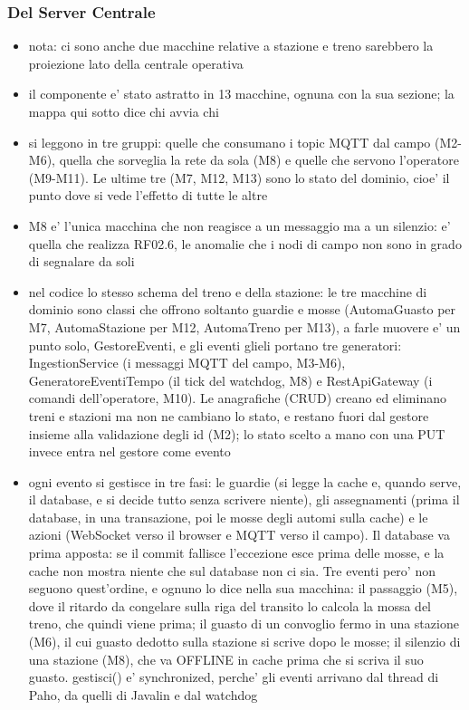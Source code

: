 \documentclass[11pt]{article}
\begin{document}
\subsubsection{Del Server Centrale}
\label{sec:orgd73620b}
\begin{itemize}
\item nota: ci sono anche due macchine relative a stazione e treno sarebbero la proiezione lato della centrale operativa
\item il componente e' stato astratto in 13 macchine, ognuna con la sua sezione; la mappa qui sotto dice chi avvia chi
\item si leggono in tre gruppi: quelle che consumano i topic MQTT dal campo (M2-M6), quella che sorveglia la rete da sola (M8) e quelle che servono l'operatore (M9-M11). Le ultime tre (M7, M12, M13) sono lo stato del dominio, cioe' il punto dove si vede l'effetto di tutte le altre
\item M8 e' l'unica macchina che non reagisce a un messaggio ma a un silenzio: e' quella che realizza RF02.6, le anomalie che i nodi di campo non sono in grado di segnalare da soli
\item nel codice lo stesso schema del treno e della stazione: le tre macchine di dominio sono classi che offrono soltanto guardie e mosse (AutomaGuasto per M7, AutomaStazione per M12, AutomaTreno per M13), a farle muovere e' un punto solo, GestoreEventi, e gli eventi glieli portano tre generatori: IngestionService (i messaggi MQTT del campo, M3-M6), GeneratoreEventiTempo (il tick del watchdog, M8) e RestApiGateway (i comandi dell'operatore, M10). Le anagrafiche (CRUD) creano ed eliminano treni e stazioni ma non ne cambiano lo stato, e restano fuori dal gestore insieme alla validazione degli id (M2); lo stato scelto a mano con una PUT invece entra nel gestore come evento
\item ogni evento si gestisce in tre fasi: le guardie (si legge la cache e, quando serve, il database, e si decide tutto senza scrivere niente), gli assegnamenti (prima il database, in una transazione, poi le mosse degli automi sulla cache) e le azioni (WebSocket verso il browser e MQTT verso il campo). Il database va prima apposta: se il commit fallisce l'eccezione esce prima delle mosse, e la cache non mostra niente che sul database non ci sia. Tre eventi pero' non seguono quest'ordine, e ognuno lo dice nella sua macchina: il passaggio (M5), dove il ritardo da congelare sulla riga del transito lo calcola la mossa del treno, che quindi viene prima; il guasto di un convoglio fermo in una stazione (M6), il cui guasto dedotto sulla stazione si scrive dopo le mosse; il silenzio di una stazione (M8), che va OFFLINE in cache prima che si scriva il suo guasto. gestisci() e' synchronized, perche' gli eventi arrivano dal thread di Paho, da quelli di Javalin e dal watchdog
\end{itemize}
\end{document}
